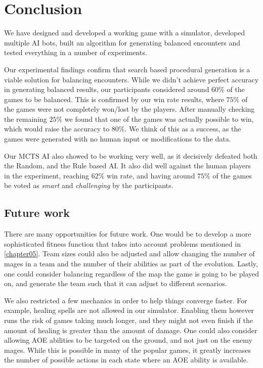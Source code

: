 \chapter{Conclusion}
\label{chapter06}

We have designed and developed a working game with a simulator, developed multiple
AI bots, built an algorithm for generating balanced encounters and tested everything
in a number of experiments.

Our experimental findings confirm that search based procedural generation
is a viable solution for balancing encounters. While we didn't achieve perfect
accuracy in generating balanced results, our participants considered around $60\%$
of the games to be balanced. This is confirmed by our win rate results, where $75\%$
of the games were not completely won/lost by the players. After manually checking the remaining
$25\%$ we found that one of the games was actually possible to win, which would raise the accuracy
to $80\%$. We think of this as a success, as the games were generated with no human input or modifications to the data.

Our MCTS AI also showed to be working very well, as it decisively defeated both the Random, and the Rule based AI.
It also did well against the human players in the experiment, reaching $62\%$ win rate, and having around $75\%$ of the
games be voted as \emph{smart} and \emph{challenging} by the participants.

\section{Future work}

There are many opportunities for future work. One would be to develop a more sophisticated fitness function that
takes into account problems mentioned in \autoref{chapter05}. Team sizes could also be adjusted and allow changing the number of mages in a team and the number of their abilities as part of the evolution. Lastly, one could consider balancing regardless of the map the game is going to be played on, and generate the team such that it can adjust to different scenarios.

We also restricted a few mechanics in order to help things converge faster. For example, healing spells are not allowed in our simulator. Enabling them however runs the risk of games taking much longer, and they might not even finish if the amount of healing is greater than the amount of damage. One could also consider allowing AOE abilities to be targeted on the ground, and not just on the enemy mages. While this is possible in many of the popular games, it greatly increases the number of possible actions in each state where an AOE ability is available.